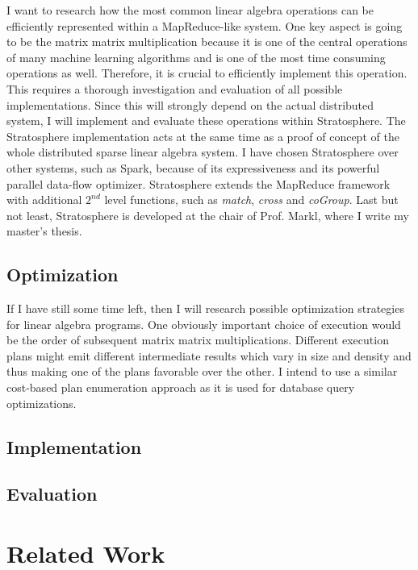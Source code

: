 \documentclass{dima}
\begin{document}
I want to research how the most common linear algebra operations can be efficiently represented within a MapReduce-like system.
One key aspect is going to be the matrix matrix multiplication because it is one of the central operations of many machine learning algorithms and is one of the most time consuming operations as well.
Therefore, it is crucial to efficiently implement this operation.
This requires a thorough investigation and evaluation of all possible implementations.
Since this will strongly depend on the actual distributed system, I will implement and evaluate these operations within Stratosphere.
The Stratosphere implementation acts at the same time as a proof of concept of the whole distributed sparse linear algebra system.
I have chosen Stratosphere over other systems, such as Spark, because of its expressiveness and its powerful parallel data-flow optimizer.
Stratosphere extends the MapReduce framework with additional $2^{nd}$ level functions, such as \emph{match}, \emph{cross} and \emph{coGroup}.
Last but not least, Stratosphere is developed at the chair of Prof. Markl, where I write my master's thesis.

\subsection{Optimization}

If I have still some time left, then I will research possible optimization strategies for linear algebra programs.
One obviously important choice of execution would be the order of subsequent matrix matrix multiplications.
Different execution plans might emit different intermediate results which vary in size and density and thus making one of the plans favorable over the other.
I intend to use a similar cost-based plan enumeration approach as it is used for database query optimizations.

\subsection{Implementation}

\subsection{Evaluation}

\section{Related Work}
\end{document}

